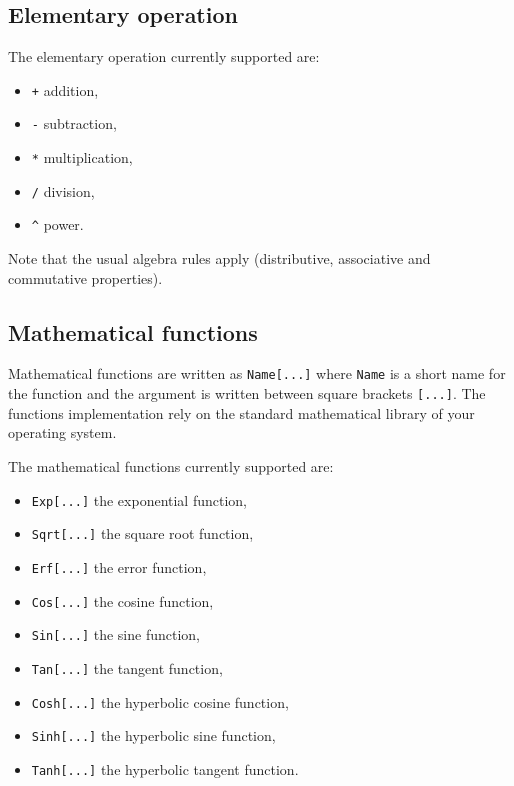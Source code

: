 \documentclass[12pt,a4paper]{report}
\begin{document}
\subsection{Elementary operation}
The elementary operation currently supported are:
\begin{itemize}
\item \texttt{+} addition,
\item \texttt{-} subtraction,
\item \texttt{*} multiplication,
\item \texttt{/} division,
\item \texttt{\^} power.
\end{itemize}
Note that the usual algebra rules apply (distributive, associative and commutative properties).

\subsection{Mathematical functions}
Mathematical functions are written as \texttt{Name[...]} where \texttt{Name} is a short name for the function and the argument is written between square brackets \texttt{[...]}.
The functions implementation rely on the standard mathematical library of your operating system.

The mathematical functions currently supported are:
\begin{itemize}
\item \texttt{Exp[...]} the exponential function,
\item \texttt{Sqrt[...]} the square root function,
\item \texttt{Erf[...]} the error function,
\item \texttt{Cos[...]} the cosine function,
\item \texttt{Sin[...]} the sine function,
\item \texttt{Tan[...]} the tangent function,
\item \texttt{Cosh[...]} the hyperbolic cosine function,
\item \texttt{Sinh[...]} the hyperbolic sine function,
\item \texttt{Tanh[...]} the hyperbolic tangent function.
\end{itemize}
\end{document}
